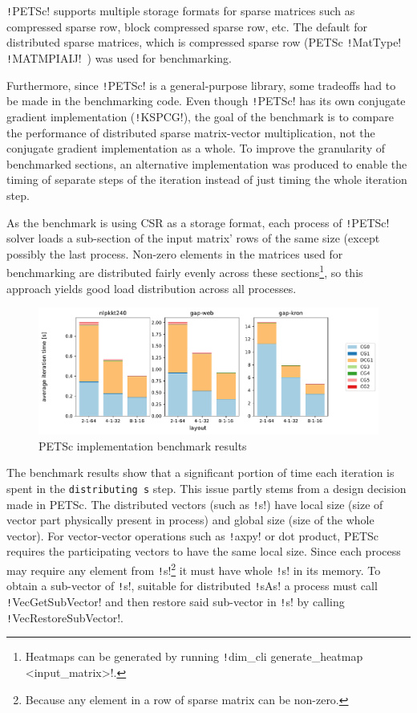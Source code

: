 \documentclass[thesis=M,english]{FITthesis}[2019/12/23]
\newcommand{\csre}[1]{\texttt!#1!}
\begin{document}
\csre{PETSc} supports
multiple storage formats for sparse matrices such as compressed sparse row, block compressed
sparse row, etc. The default for distributed sparse matrices, which is compressed sparse row
(PETSc \csre{MatType} \csre{MATMPIAIJ}~\cite{petsc-user-ref}) was used for benchmarking.

Furthermore, since \csre{PETSc} is a general-purpose library, some tradeoffs had to be made
in the benchmarking code. Even though \csre{PETSc} has its own conjugate gradient implementation
(\csre{KSPCG}),
the goal of the benchmark is to compare the performance of distributed sparse matrix-vector
multiplication, not the conjugate gradient implementation as a whole. To improve the granularity
of benchmarked sections, an alternative
implementation was produced to enable the timing of separate steps of the iteration instead of just
timing the whole iteration step.

As the benchmark is using CSR as a storage format,
each process of \csre{PETSc} solver loads a sub-section of the input matrix' rows of the same size (except possibly the last
process. Non-zero elements in the matrices used for benchmarking are distributed fairly
evenly across these sections\footnote{Heatmaps can be generated by running  \csre{dim_cli generate_heatmap <input_matrix>}.},
so this approach yields good load distribution across all processes.

\begin{figure}[htp]
    \centering
    \includegraphics[scale=0.5]{static/petsc_mpi.pdf}
    \caption{PETSc implementation benchmark results}
\end{figure}

The benchmark results show that a significant portion of time each iteration is spent in the \texttt{distributing s}
step. This issue partly stems from a design decision made in PETSc. The distributed vectors (such as \csre{s})
have local size (size of vector part physically present in process) and global size (size of the whole vector).
For vector-vector operations such as \csre{axpy} or dot product, PETSc requires the participating vectors to
have the same local size. Since each process may require any element from
\csre{s}\footnote{Because any element in a row of sparse matrix can be non-zero.} it must have whole \csre{s}
in its memory. To obtain a sub-vector of \csre{s}, suitable for distributed \csre{sAs} a process must call
\csre{VecGetSubVector} and then restore said sub-vector in \csre{s} by calling \csre{VecRestoreSubVector}.
\end{document}
